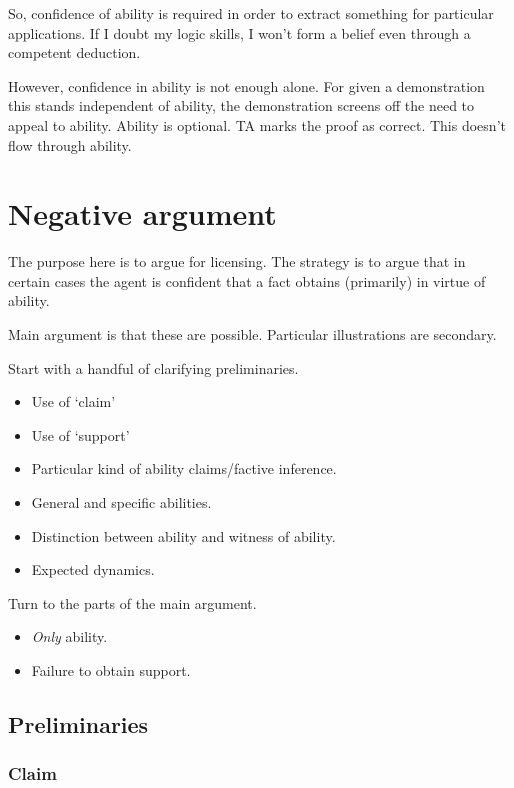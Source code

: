 \documentclass[10pt]{article}
\begin{document}
So, confidence of ability is required in order to extract something for particular applications.
If I doubt my logic skills, I won't form a belief even through a competent deduction.

However, confidence in ability is not enough alone.
For given a demonstration this stands independent of ability, the demonstration screens off the need to appeal to ability.
Ability is optional.
TA marks the proof as correct.
This doesn't flow through ability.




\newpage

\section{Negative argument}
\label{sec:negative-argument}

\begin{note}[Goal]
  The purpose here is to argue for licensing.
  The strategy is to argue that in certain cases the agent is confident that a fact obtains (primarily) in virtue of ability.

  Main argument is that these are possible.
  Particular illustrations are secondary.

  Start with a handful of clarifying preliminaries.
  \begin{itemize}
  \item Use of `claim'
  \item Use of `support'
  \item Particular kind of ability claims/factive inference.
  \item General and specific abilities.
  \item Distinction between ability and witness of ability.
  \item Expected dynamics.
  \end{itemize}
  Turn to the parts of the main argument.
  \begin{itemize}
  \item \emph{Only} ability.
  \item Failure to obtain support.
  \end{itemize}
\end{note}

\subsection{Preliminaries}
\label{sec:preliminaries}

\subsubsection{Claim}
\label{sec:claim}
\end{document}
